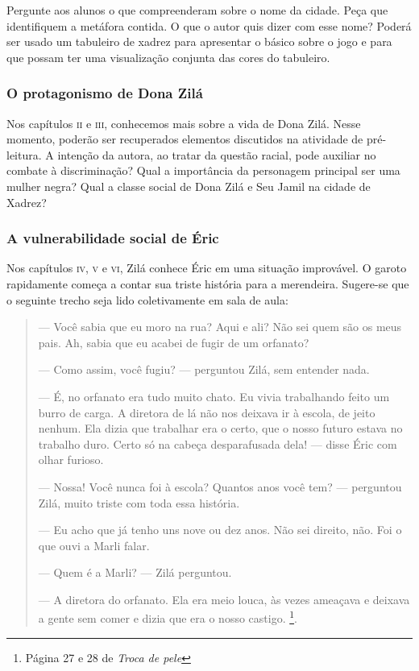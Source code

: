 \documentclass[11pt]{extarticle}
\begin{document}
Pergunte aos alunos o que compreenderam sobre o nome da cidade. Peça que identifiquem a metáfora contida. O que o autor quis dizer com esse nome? Poderá ser usado um tabuleiro de xadrez para apresentar o básico sobre o jogo e para que possam ter uma visualização conjunta das cores do tabuleiro. 

\subsubsection{O protagonismo de Dona Zilá}

Nos capítulos \textsc{ii} e \textsc{iii}, conhecemos mais sobre a vida de Dona Zilá. Nesse momento, poderão ser recuperados elementos discutidos na atividade de pré-leitura. A intenção da autora, ao tratar da questão racial, pode auxiliar no combate à discriminação? Qual a importância da personagem principal ser uma mulher negra? Qual a classe social de Dona Zilá e Seu Jamil na cidade de Xadrez?


\subsubsection{A vulnerabilidade social de Éric}

Nos capítulos \textsc{iv}, \textsc{v} e \textsc{vi}, Zilá conhece Éric em uma situação improvável. O garoto rapidamente começa a contar sua triste história para a merendeira. Sugere-se que o seguinte trecho seja lido coletivamente em sala de aula:

\begin{quote}
— Você sabia que eu moro na rua? Aqui e ali? Não sei quem são os meus pais. Ah, sabia que eu acabei de fugir de um orfanato?

— Como assim, você fugiu? — perguntou Zilá, sem entender nada.

— É, no orfanato era tudo muito chato. Eu vivia trabalhando feito um burro de carga. A diretora de lá não nos deixava ir à escola, de jeito nenhum. Ela dizia que trabalhar era o certo, que o nosso futuro estava no trabalho duro. Certo só na cabeça desparafusada dela! — disse Éric com olhar furioso. 

— Nossa! Você nunca foi à escola? Quantos anos você tem? — perguntou Zilá, muito triste com toda essa história.

— Eu acho que já tenho uns nove ou dez anos. Não sei direito, não. Foi o que ouvi a Marli falar.

— Quem é a Marli? — Zilá perguntou.

— A diretora do orfanato. Ela era meio louca, às vezes ameaçava e deixava a gente sem comer e dizia que era o nosso castigo.
\footnote{Página 27 e 28 de \textit{Troca de pele}}.

\end{quote}
\end{document}
